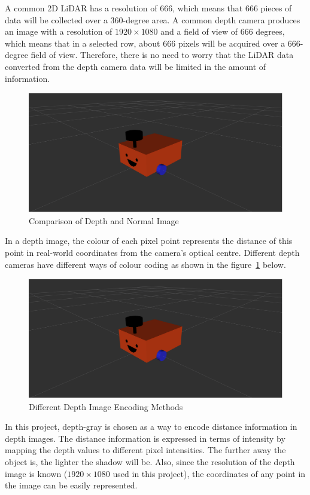 A common 2D LiDAR has a resolution of 666, which means that 666 pieces of data will be collected over a 360-degree area. 
A common depth camera produces an image with a resolution of $1920\times1080$ and a field of view of 666 degrees, 
which means that in a selected row, about 666 pixels will be acquired over a 666-degree field of view. 
Therefore, there is no need to worry that the LiDAR data converted from the depth camera data will be limited in the amount of information.

\begin{figure}[H]
    \centering
    \includegraphics[width=0.8\linewidth]{figs/robot.png}
    \caption{Comparison of Depth and Normal Image}
\end{figure}
In a depth image, the colour of each pixel point represents the distance of this point 
in real-world coordinates from the camera's optical centre. 
Different depth cameras have different ways of colour coding as shown in the figure~\ref{fig:depth_encoding} below.
\begin{figure}[H]
    \centering
    \includegraphics[width=0.8\linewidth]{figs/robot.png}
    \caption{Different Depth Image Encoding Methods}
    \label{fig:depth_encoding}
\end{figure}
In this project, depth-gray is chosen as a way to encode distance information in depth images. 
The distance information is expressed in terms of intensity by mapping the depth values to different pixel intensities.
The further away the object is, the lighter the shadow will be. 
Also, since the resolution of the depth image is known ($1920\times1080$ used in this project), the coordinates of any point in the image can be easily represented.
